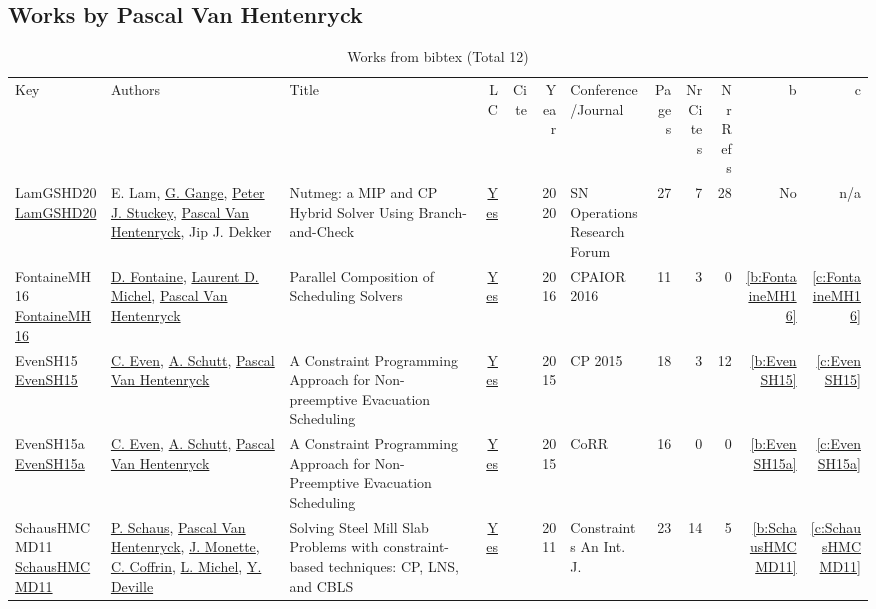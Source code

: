 \subsection{Works by Pascal Van Hentenryck}
\label{sec:a149}
{\scriptsize
\begin{longtable}{>{\raggedright\arraybackslash}p{3cm}>{\raggedright\arraybackslash}p{6cm}>{\raggedright\arraybackslash}p{6.5cm}rrrp{2.5cm}rrrrr}
\rowcolor{white}\caption{Works from bibtex (Total 12)}\\ \toprule
\rowcolor{white}Key & Authors & Title & LC & Cite & Year & \shortstack{Conference\\/Journal} & Pages & \shortstack{Nr\\Cites} & \shortstack{Nr\\Refs} & b & c \\ \midrule\endhead
\bottomrule
\endfoot
LamGSHD20 \href{http://dx.doi.org/10.1007/s43069-020-00023-2}{LamGSHD20} & E. Lam, \hyperref[auth:a187]{G. Gange}, \hyperref[auth:a126]{Peter J. Stuckey}, \hyperref[auth:a149]{Pascal Van Hentenryck}, Jip J. Dekker & Nutmeg: a MIP and CP Hybrid Solver Using Branch-and-Check & \href{works/LamGSHD20.pdf}{Yes} & \cite{LamGSHD20} & 2020 & SN Operations Research Forum & 27 & 7 & 28 & No & n/a\\
FontaineMH16 \href{https://doi.org/10.1007/978-3-319-33954-2\_12}{FontaineMH16} & \hyperref[auth:a321]{D. Fontaine}, \hyperref[auth:a322]{Laurent D. Michel}, \hyperref[auth:a149]{Pascal Van Hentenryck} & Parallel Composition of Scheduling Solvers & \href{works/FontaineMH16.pdf}{Yes} & \cite{FontaineMH16} & 2016 & CPAIOR 2016 & 11 & 3 & 0 & \ref{b:FontaineMH16} & \ref{c:FontaineMH16}\\
EvenSH15 \href{https://doi.org/10.1007/978-3-319-23219-5\_40}{EvenSH15} & \hyperref[auth:a220]{C. Even}, \hyperref[auth:a125]{A. Schutt}, \hyperref[auth:a149]{Pascal Van Hentenryck} & A Constraint Programming Approach for Non-preemptive Evacuation Scheduling & \href{works/EvenSH15.pdf}{Yes} & \cite{EvenSH15} & 2015 & CP 2015 & 18 & 3 & 12 & \ref{b:EvenSH15} & \ref{c:EvenSH15}\\
EvenSH15a \href{http://arxiv.org/abs/1505.02487}{EvenSH15a} & \hyperref[auth:a220]{C. Even}, \hyperref[auth:a125]{A. Schutt}, \hyperref[auth:a149]{Pascal Van Hentenryck} & A Constraint Programming Approach for Non-Preemptive Evacuation Scheduling & \href{works/EvenSH15a.pdf}{Yes} & \cite{EvenSH15a} & 2015 & CoRR & 16 & 0 & 0 & \ref{b:EvenSH15a} & \ref{c:EvenSH15a}\\
SchausHMCMD11 \href{https://doi.org/10.1007/s10601-010-9100-5}{SchausHMCMD11} & \hyperref[auth:a148]{P. Schaus}, \hyperref[auth:a149]{Pascal Van Hentenryck}, \hyperref[auth:a150]{J. Monette}, \hyperref[auth:a151]{C. Coffrin}, \hyperref[auth:a32]{L. Michel}, \hyperref[auth:a152]{Y. Deville} & Solving Steel Mill Slab Problems with constraint-based techniques: CP, LNS, and {CBLS} & \href{works/SchausHMCMD11.pdf}{Yes} & \cite{SchausHMCMD11} & 2011 & Constraints An Int. J. & 23 & 14 & 5 & \ref{b:SchausHMCMD11} & \ref{c:SchausHMCMD11}\\

\end{longtable}}
